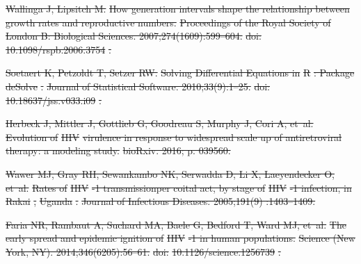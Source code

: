 \documentclass[10pt,letterpaper]{article}
\providecommand{\DIFdeltex}[1]{{\protect\color{red}\sout{#1}}}                      %
\providecommand{\DIFdel}[1]{\texorpdfstring{\DIFdeltex{#1}}{}} %
\begin{document}
\DIFdel{Wallinga J, Lipsitch M.
}%
\DIFdel{How generation intervals shape the relationship between growth rates
  and reproductive numbers.
}%
\DIFdel{Proceedings of the Royal Society of London B:
Biological Sciences.
  2007;274(1609):599--604.
}%
\DIFdel{doi:}%
\DIFdel{10.1098/rspb.2006.3754}%
\DIFdel{.
}%

\DIFdel{Soetaert K, Petzoldt T, Setzer RW.
}%
\DIFdel{Solving Differential Equations in }%
\DIFdel{R}%
\DIFdel{: Package }%
\DIFdel{deSolve}%
\DIFdel{.
}%
\DIFdel{Journal of Statistical Software. 2010;33(9):1--25.
}%
\DIFdel{doi:}%
\DIFdel{10.18637/jss.v033.i09}%
\DIFdel{.
}%

\DIFdel{Herbeck J, Mittler J, Gottlieb G, Goodreau S, Murphy J, Cori A, et~al.
}%
\DIFdel{Evolution of }%
\DIFdel{HIV}%
\DIFdel{virulence in response to widespread scale up of antiretroviral therapy: a modeling study.
}%
\DIFdel{bioRxiv. 2016; p. 039560.
}%

\DIFdel{Wawer MJ, Gray RH, Sewankambo NK, Serwadda D, Li X, Laeyendecker O, et~al.
}%
\DIFdel{Rates of }%
\DIFdel{HIV}%
\DIFdel{-1 transmissionper coital act, by stage of }%
\DIFdel{HIV}%
\DIFdel{-1
  infection, in }%
\DIFdel{Rakai}%
\DIFdel{, }%
\DIFdel{Uganda}%
\DIFdel{.
}%
\DIFdel{Journal of Infectious Diseases. 2005;191(9) :1403--1409.
}%

\DIFdel{Faria NR, Rambaut A, Suchard MA, Baele G, Bedford T, Ward MJ, et~al.
}%
\DIFdel{The early spread and epidemic ignition of }%
\DIFdel{HIV}%
\DIFdel{-1 in human
  populations. }%
\DIFdel{Science (New York, NY). 2014;346(6205):56--61.
}%
\DIFdel{doi:}%
\DIFdel{10.1126/science.1256739}%
\DIFdel{.
}%
\end{document}
